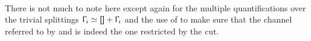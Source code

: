 \begin{code}
\AgdaSymbol{)}\AgdaSpace{}%
\AgdaSpace{}%
\AgdaSpace{}%
\<%
\\
\>[316I][@{}l@{\AgdaIndent{0}}]%
\>[29]\AgdaSpace{}%
\AgdaSymbol{(}\AgdaSpace{}%
\AgdaSpace{}%
\AgdaOperator{\AgdaInductiveConstructor{<}}\AgdaSpace{}%
\AgdaSpace{}%
\AgdaSpace{}%
\AgdaSymbol{(}\AgdaSpace{}%
\AgdaOperator{\AgdaInductiveConstructor{,}}\AgdaSpace{}%
\AgdaSymbol{)))}\AgdaSpace{}%
\AgdaSpace{}%
\AgdaSpace{}%
\AgdaSymbol{(}\AgdaSpace{}%
\AgdaSpace{}%
\AgdaSpace{}%
\AgdaSpace{}%
\AgdaSymbol{)}\<%
\end{code}

There is not much to note here except again for the multiple quantifications
over the trivial splittings $\Context_i \simeq \AgdaInductiveConstructor{[]} +
\Context_i$ and the use of \AgdaInductiveConstructor{<} to make sure that the
channel referred to by  and
 is indeed the one restricted by the cut.

